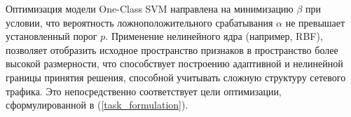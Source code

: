 Оптимизация модели One-Class SVM направлена на минимизацию $\beta$ при условии, что вероятность ложноположительного срабатывания $\alpha$ не превышает установленный порог $p$. Применение нелинейного ядра (например, RBF), позволяет отобразить исходное пространство признаков в пространство более высокой размерности, что способствует построению адаптивной и нелинейной границы принятия решения, способной учитывать сложную структуру сетевого трафика. Это непосредственно соответствует цели оптимизации, сформулированной в (\ref{task_formulation}).
